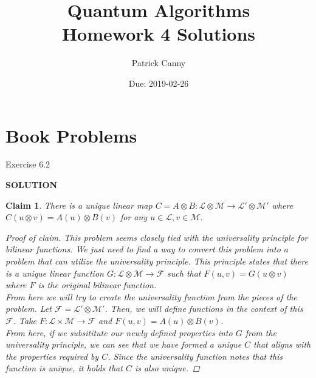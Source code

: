\documentclass{exam} %
\newcommand{\cl}[1]{\mathcal{#1}}  %
\theoremstyle{plain}
\newtheorem{claim}[thm]{Claim}      \newtheorem*{claim*}{Claim}
\theoremstyle{definition}
\theoremstyle{remark}
\newenvironment{claimproof} {
  \begin{proof}[Proof of claim]
  \renewcommand{\qedsymbol}{\ensuremath{\bullet}}
  } {
  \end{proof}
  }
\numberwithin{equation}{section}  %
\newcommand{\sol}{\begin{center}\textbf{SOLUTION}\end{center}}
\begin{document}
\title{Quantum Algorithms \\ Homework 4 Solutions}
\author{Patrick Canny}
\date{Due: 2019-02-26}
\maketitle
\thispagestyle{foot}
\section {Book Problems}
\begin{questions}
  \question Exercise 6.2\\
  \sol
  \begin{claim} There is a unique linear map $C = A \otimes B: \cl{L} \otimes 
    \cl{M} \rightarrow \cl{L}' \otimes \cl{M}'$ where $C(u \otimes v) = A(u) 
    \otimes B(v)$ for any $u \in \cl{L}, v \in \cl{M}$.
    \begin{claimproof} This problem seems closely tied with the universality 
      principle for bilinear functions. We just need to find a way to convert 
      this problem into a problem that can utilize the universality principle.
      This principle states that there is a unique linear function $G: \cl{L}
      \otimes \cl{M} \rightarrow \cl{F}$ such that $F(u,v) = G(u\otimes v)$
      where $F$ is the original bilinear function.\\

      From here we will try to create the universality function from the pieces
      of the problem. Let $\cl{F} = \cl{L}' \otimes \cl{M}'$. Then, we will 
      define functions in the context of this $\cl{F}$. Take $F: \cl{L} \times 
      \cl{M} \rightarrow \cl{F}$ and $F(u, v) = A(u) \otimes B(v)$.\\

      From here, if we subsititute our newly defined properties into $G$ from
      the universality principle, we can see that we have formed a unique $C$
      that aligns with the properties required by $C$. Since the universality
      function notes that this function is unique, it holds that $C$ is also 
      unique.
    \end{claimproof}
  \end{claim}
\end{questions}
\end{document}
